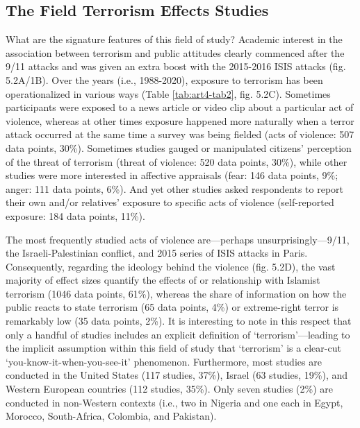 \subsection{The Field Terrorism Effects Studies}
\label{sec:541}
What are the signature features of this field of study? Academic interest in the association between terrorism and public attitudes clearly commenced after the 9/11 attacks and was given an extra boost with the 2015-2016 ISIS attacks (fig. 5.2A/1B). Over the years (i.e., 1988-2020), exposure to terrorism has been operationalized in various ways (Table \ref{tab:art4-tab2}, fig. 5.2C). Sometimes participants were exposed to a news article or video clip about a particular act of violence, whereas at other times exposure happened more naturally when a terror attack occurred at the same time a survey was being fielded (acts of violence: 507 data points, 30\%). Sometimes studies gauged or manipulated citizens’ perception of the threat of terrorism (threat of violence: 520 data points, 30\%), while other studies were more interested in affective appraisals (fear: 146 data points, 9\%; anger: 111 data points, 6\%). And yet other studies asked respondents to report their own and/or relatives’ exposure to specific acts of violence (self-reported exposure: 184 data points, 11\%). 

The most frequently studied acts of violence are—perhaps unsurprisingly—9/11, the Israeli-Palestinian conflict, and 2015 series of ISIS attacks in Paris. Consequently, regarding the ideology behind the violence (fig. 5.2D), the vast majority of effect sizes quantify the effects of or relationship with Islamist terrorism (1046 data points, 61\%), whereas the share of information on how the public reacts to state terrorism (65 data points, 4\%) or extreme-right terror is remarkably low (35 data points, 2\%). It is interesting to note in this respect that only a handful of studies includes an explicit definition of ‘terrorism’—leading to the implicit assumption within this field of study that ‘terrorism’ is a clear-cut ‘you-know-it-when-you-see-it’ phenomenon. Furthermore, most studies are conducted in the United States (117 studies, 37\%), Israel (63 studies, 19\%), and Western European countries (112 studies, 35\%). Only seven studies (2\%) are conducted in non-Western contexts (i.e., two in Nigeria and one each in Egypt, Morocco, South-Africa, Colombia, and Pakistan).

